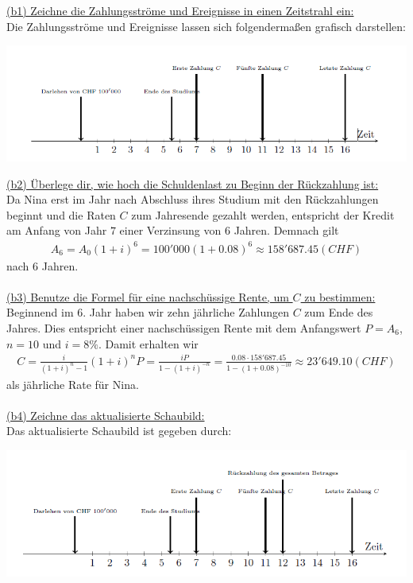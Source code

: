 \underline{(b1) Zeichne die Zahlungsströme und Ereignisse in einen Zeitstrahl ein:}\\
Die Zahlungsströme und Ereignisse lassen sich folgendermaßen
grafisch darstellen:
\begin{center}
	\includegraphics{pictures/zeitstrahl_1}
\end{center}
\newpage
\underline{(b2) Überlege dir, wie hoch die Schuldenlast zu Beginn der Rückzahlung ist:}\\
Da Nina erst im Jahr nach Abschluss ihres Studium mit den Rückzahlungen beginnt und die Raten $ C $ zum Jahresende gezahlt werden, entspricht der Kredit am Anfang von Jahr $ 7 $ einer Verzinsung von $ 6  $ Jahren.
Demnach gilt
\begin{align*}
A_6 = A_0 (1 + i)^6
= 100'000 (1+0.08)^6 \approx 158'687.45 (CHF)
\end{align*}
nach $ 6 $ Jahren.\\
\\
\underline{(b3) Benutze die Formel für eine nachschüssige Rente, um $ C $ zu bestimmen:}\\
Beginnend im $ 6. $ Jahr haben wir zehn jährliche Zahlungen $ C $ zum Ende des Jahres.
Dies entspricht einer nachschüssigen Rente mit dem Anfangswert $ P  = A_6 $, $ n = 10  $ und $ i = 8 \% $.
Damit erhalten wir 
\begin{align*}
C = \frac{i}{(1+i)^n-1}(1+i)^n P
=\frac{i P}{1 - (1+i)^{-n}}
=
\frac{0.08 \cdot 158'687.45}{1-(1+0.08)^{-10}}
\approx 
23'649.10 (CHF)
\end{align*}
als jährliche Rate für Nina.\\
\\
\underline{(b4) Zeichne das aktualisierte Schaubild:}\\
Das aktualisierte Schaubild ist gegeben durch:
\begin{center}
	\includegraphics{pictures/zeitstrahl_2}
\end{center}
